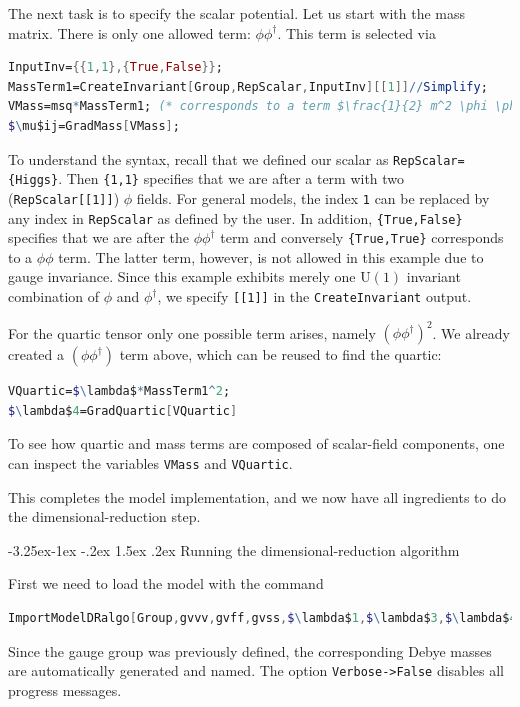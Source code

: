 \documentclass[11pt]{article}
\makeatletter
\renewcommand\subsection{\@startsection{subsection}{2}{\z@}%
  {-3.25ex\@plus -1ex \@minus -.2ex}%
  {1.5ex \@plus .2ex}%
  {\normalfont\normalsize\bfseries}}
\makeatother
\begin{document}
The next task is to specify the scalar potential.
Let us start with the mass matrix.
There is only one allowed term: $\phi \phi^\dagger$.
This term is selected via
\begin{lstlisting}[language=Mathematica,mathescape=true]
InputInv={{1,1},{True,False}};
MassTerm1=CreateInvariant[Group,RepScalar,InputInv][[1]]//Simplify;
VMass=msq*MassTerm1; (* corresponds to a term $\frac{1}{2} m^2 \phi \phi^{\dagger}$ *)
$\mu$ij=GradMass[VMass];
\end{lstlisting}
To understand the syntax, recall that we defined our scalar as
{\verb!RepScalar={Higgs}!}.
Then
{\verb!{1,1}!} specifies that we are after a term with two ({\tt RepScalar[[1]]}) $\phi$ fields.
For general models, 
the index {\tt 1} can be replaced by any index in {\tt RepScalar} as defined by the user. 
In addition,
{\verb!{True,False}!} specifies that we are after
the $\phi \phi^\dagger$ term and
conversely
{\verb!{True,True}!} corresponds to
a $\phi \phi$ term.
The latter term, however,
is not allowed in this example due to gauge invariance.
Since this example exhibits merely
one $\mathrm{U}(1)$ invariant combination of $\phi$ and $\phi^\dagger$,
we specify {\tt [[1]]} in the {\tt CreateInvariant} output.

For the quartic tensor only one possible term arises, namely
$(\phi \phi^\dagger)^2$.
We already created a
$(\phi \phi^\dagger)$ term above,
which can be reused to find the quartic:
\begin{lstlisting}[language=Mathematica,mathescape=true]
VQuartic=$\lambda$*MassTerm1^2;
$\lambda$4=GradQuartic[VQuartic]
\end{lstlisting}
To see how
quartic and mass terms are composed of scalar-field components,
one can inspect the variables
{\tt VMass} and
{\tt VQuartic}.

This completes the model implementation, and we now have all ingredients to do
the dimensional-reduction step.

\subsection{Running the dimensional-reduction algorithm}

First we need to load the model with the command
\begin{lstlisting}[language=Mathematica,mathescape=true]
ImportModelDRalgo[Group,gvvv,gvff,gvss,$\lambda$1,$\lambda$3,$\lambda$4,$\mu$ij,$\mu$IJ,$\mu$IJC,Ysff,YsffC,Verbose->False];
\end{lstlisting}
Since the gauge group was previously defined,
the corresponding Debye masses are automatically generated and named.
The option {\tt Verbose->False} disables all progress messages.
\end{document}
